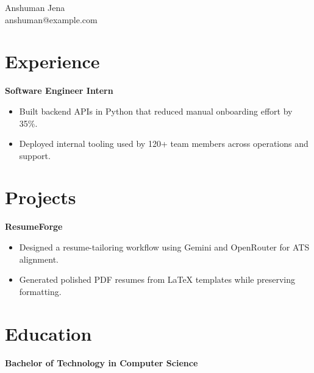 \documentclass[11pt]{article}
\begin{document}
\begin{center}
{\LARGE Anshuman Jena}\\
anshuman@example.com
\end{center}

\section{Experience}
\textbf{Software Engineer Intern}
\begin{itemize}[leftmargin=*]
\item Built backend APIs in Python that reduced manual onboarding effort by 35\%.
\item Deployed internal tooling used by 120+ team members across operations and support.
\end{itemize}

\section{Projects}
\textbf{ResumeForge}
\begin{itemize}[leftmargin=*]
\item Designed a resume-tailoring workflow using Gemini and OpenRouter for ATS alignment.
\item Generated polished PDF resumes from LaTeX templates while preserving formatting.
\end{itemize}

\section{Education}
\textbf{Bachelor of Technology in Computer Science}
\end{document}
